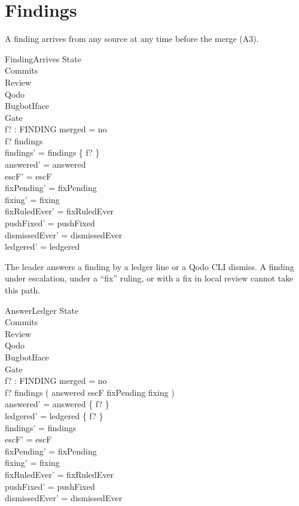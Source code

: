 \documentclass{article}
\begin{document}
\section{Findings}

A finding arrives from any source at any time before the merge (A3).

\begin{schema}{FindingArrives}
  \Delta State \\
  \Xi Commits \\
  \Xi Review \\
  \Xi Qodo \\
  \Xi BugbotIface \\
  \Xi Gate \\
  f? : FINDING
\where
  merged = no \\
  f? \notin findings \\
  findings' = findings \cup \{ f? \} \\
  answered' = answered \\
  escF' = escF \\
  fixPending' = fixPending \\
  fixing' = fixing \\
  fixRuledEver' = fixRuledEver \\
  pushFixed' = pushFixed \\
  dismissedEver' = dismissedEver \\
  ledgered' = ledgered
\end{schema}

The leader answers a finding by a ledger line or a Qodo CLI dismiss. A finding
under escalation, under a ``fix'' ruling, or with a fix in local review cannot
take this path.

\begin{schema}{AnswerLedger}
  \Delta State \\
  \Xi Commits \\
  \Xi Review \\
  \Xi Qodo \\
  \Xi BugbotIface \\
  \Xi Gate \\
  f? : FINDING
\where
  merged = no \\
  f? \in findings \setminus ( answered \cup escF \cup fixPending \cup fixing ) \\
  answered' = answered \cup \{ f? \} \\
  ledgered' = ledgered \cup \{ f? \} \\
  findings' = findings \\
  escF' = escF \\
  fixPending' = fixPending \\
  fixing' = fixing \\
  fixRuledEver' = fixRuledEver \\
  pushFixed' = pushFixed \\
  dismissedEver' = dismissedEver
\end{schema}
\end{document}
